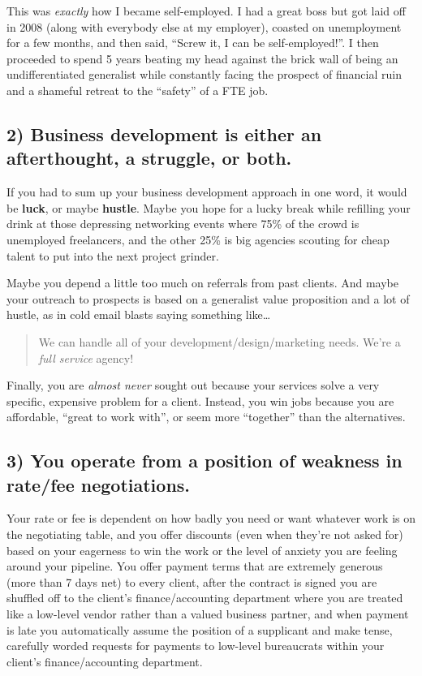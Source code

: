 This was \emph{exactly} how I became self-employed. I had a great boss but got laid off in 2008 (along with everybody else at my employer), coasted on unemployment for a few months, and then said, ``Screw it, I can be self-employed!''. I then proceeded to spend 5 years beating my head against the brick wall of being an undifferentiated generalist while constantly facing the prospect of financial ruin and a shameful retreat to the ``safety'' of a FTE job.

\subsection{2) \textbf{Business development is either an afterthought, a struggle, or both}.}

If you had to sum up your business development approach in one word, it would be \textbf{luck}, or maybe \textbf{hustle}. Maybe you hope for a lucky break while refilling your drink at those depressing networking events where 75\% of the crowd is unemployed freelancers, and the other 25\% is big agencies scouting for cheap talent to put into the next project grinder.

Maybe you depend a little too much on referrals from past clients. And maybe your outreach to prospects is based on a generalist value proposition and a lot of hustle, as in cold email blasts saying something like\ldots{}

\begin{quote}
We can handle all of your development/design/marketing needs. We're a \emph{full service} agency!
\end{quote}

Finally, you are \emph{almost never} sought out because your services solve a very specific, expensive problem for a client. Instead, you win jobs because you are affordable, ``great to work with”, or seem more ``together'' than the alternatives.

\subsection{3) \textbf{You operate from a position of weakness in rate/fee negotiations}.}

Your rate or fee is dependent on how badly you need or want whatever work is on the negotiating table, and you offer discounts (even when they're not asked for) based on your eagerness to win the work or the level of anxiety you are feeling around your pipeline. You offer payment terms that are extremely generous (more than 7 days net) to every client, after the contract is signed you are shuffled off to the client's finance/accounting department where you are treated like a low-level vendor rather than a valued business partner, and when payment is late you automatically assume the position of a supplicant and make tense, carefully worded requests for payments to low-level bureaucrats within your client's finance/accounting department.

